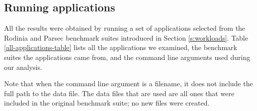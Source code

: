 \documentclass[12pt,twoside]{reedthesis}
\begin{document}
	
	
		\subsection{Running applications}
		
		All the results were obtained by running a set of applications selected from the Rodinia and Parsec benchmark suites introduced in Section \ref{s:workloads}.
		Table \ref{all-applications-table} lists all the applications we examined, the benchmark suites the applications came from, and the command line arguments used during our analysis. 
		
		Note that when the command line argument is a filename, it does not include the full path to the data file. The data files that are used are all ones that were included in the original benchmark suite; no new files were created. 
		
\end{document}
